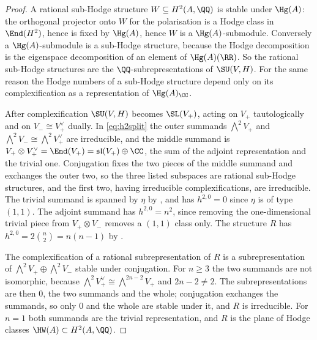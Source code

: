 \begin{proof}
A rational sub-Hodge structure $W\subseteq H^{2}(A,\QQ)$ is stable under
$\Hg(A)$: the orthogonal projector onto $W$ for the polarisation is a Hodge
class in $\End(H^{2})$, hence is fixed by $\Hg(A)$, hence $W$ is a
$\Hg(A)$-submodule. Conversely a $\Hg(A)$-submodule is a sub-Hodge structure,
because the Hodge decomposition is the eigenspace decomposition of an element
of $\Hg(A)(\RR)$. So the rational sub-Hodge structures are the
$\QQ$-subrepresentations of $\SU(V,H)$. For the same reason the Hodge numbers
of a sub-Hodge structure depend only on its complexification as a
representation of $\Hg(A)_{\CC}$.

After complexification $\SU(V,H)$ becomes $\SL(V_{+})$, acting on $V_{+}$
tautologically and on $V_{-}\cong V_{+}^{\vee}$ dually. In \eqref{eq:h2split}
the outer summands $\bigwedge^{2}V_{+}$ and
$\bigwedge^{2}V_{-}\cong\bigwedge^{2}V_{+}^{\vee}$ are irreducible, and the
middle summand is $V_{+}\otimes V_{+}^{\vee}=\End(V_{+})
=\mathfrak{sl}(V_{+})\oplus\CC$, the sum of the adjoint representation and the
trivial one. Conjugation fixes the two pieces of the middle summand and
exchanges the outer two, so the three listed subspaces are rational sub-Hodge
structures, and the first two, having irreducible complexifications, are
irreducible. The trivial summand is spanned by $\eta$ by ,
and has $h^{2,0}=0$ since $\eta$ is of type $(1,1)$. The adjoint summand has
$h^{2,0}=n^{2}$, since removing the one-dimensional trivial piece from
$V_{+}\otimes V_{-}$ removes a $(1,1)$ class only. The structure $R$ has
$h^{2,0}=2\binom{n}{2}=n(n-1)$ by .

The complexification of a rational subrepresentation of $R$ is a
subrepresentation of $\bigwedge^{2}V_{+}\oplus\bigwedge^{2}V_{-}$ stable under
conjugation. For $n\ge3$ the two summands are not isomorphic, because
$\bigwedge^{2}V_{+}^{\vee}\cong\bigwedge^{2n-2}V_{+}$ and $2n-2\ne2$. The
subrepresentations are then $0$, the two summands and the whole; conjugation
exchanges the summands, so only $0$ and the whole are stable under it, and
$R$ is irreducible.
For $n=1$ both summands are the trivial representation, and $R$ is the plane
of Hodge classes $\HW(A)\subset H^{2}(A,\QQ)$.


\end{proof}
